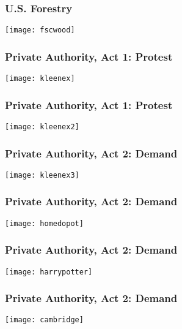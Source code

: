 \begin{frame}
\frametitle{U.S. Forestry }
\texttt{[image: fscwood]}
\end{frame}



\begin{frame}
\frametitle{Private Authority, Act 1: Protest}
\texttt{[image: kleenex]}

\end{frame}

\begin{frame}
\frametitle{Private Authority, Act 1: Protest}
\texttt{[image: kleenex2]}
\end{frame}

\begin{frame}
\frametitle{Private Authority, Act 2: Demand}
\centering
\texttt{[image: kleenex3]}
\end{frame}

\begin{frame}
\frametitle{Private Authority, Act 2: Demand}
\centering
\texttt{[image: homedopot]}
\end{frame}

\begin{frame}
\frametitle{Private Authority, Act 2: Demand}
\texttt{[image: harrypotter]}
\end{frame}

\begin{frame}
\frametitle{Private Authority, Act 2: Demand}
\texttt{[image: cambridge]}
\end{frame}


